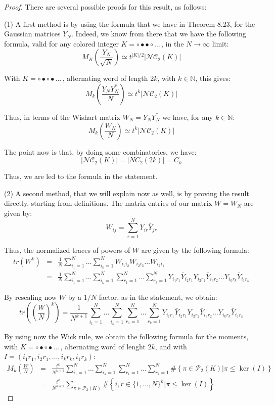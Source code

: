 \documentclass[12pt]{amsbook}
\begin{document}
\begin{proof}
There are several possible proofs for this result, as follows:

\medskip

(1) A first method is by using the formula that we have in Theorem 8.23, for the Gaussian matrices $Y_N$. Indeed, we know from there that we have the following formula, valid for any colored integer $K=\circ\bullet\bullet\circ\ldots\,$, in the $N\to\infty$ limit:
$$M_K\left(\frac{Y_N}{\sqrt{N}}\right)\simeq t^{|K|/2}|\mathcal{NC}_2(K)|$$

With $K=\circ\bullet\circ\bullet\ldots\,$, alternating word of length $2k$, with $k\in\mathbb N$, this gives:
$$M_k\left(\frac{Y_NY_N^*}{N}\right)\simeq t^k|\mathcal{NC}_2(K)|$$

Thus, in terms of the Wishart matrix $W_N=Y_NY_N^*$ we have, for any $k\in\mathbb N$:
$$M_k\left(\frac{W_N}{N}\right)\simeq t^k|\mathcal{NC}_2(K)|$$

The point now is that, by doing some combinatorics, we have:
$$|\mathcal{NC}_2(K)|=|NC_2(2k)|=C_k$$

Thus, we are led to the formula in the statement.

\medskip

(2) A second method, that we will explain now as well, is by proving the result directly, starting from definitions. The matrix entries of our matrix $W=W_N$ are given by:
$$W_{ij}=\sum_{r=1}^NY_{ir}\bar{Y}_{jr}$$

Thus, the normalized traces of powers of $W$ are given by the following formula:
\begin{eqnarray*}
tr(W^k)
&=&\frac{1}{N}\sum_{i_1=1}^N\ldots\sum_{i_k=1}^NW_{i_1i_2}W_{i_2i_3}\ldots W_{i_ki_1}\\
&=&\frac{1}{N}\sum_{i_1=1}^N\ldots\sum_{i_k=1}^N\sum_{r_1=1}^N\ldots\sum_{r_k=1}^NY_{i_1r_1}\bar{Y}_{i_2r_1}Y_{i_2r_2}\bar{Y}_{i_3r_2}\ldots Y_{i_kr_k}\bar{Y}_{i_1r_k}
\end{eqnarray*}

By rescaling now $W$ by a $1/N$ factor, as in the statement, we obtain:
$$tr\left(\left(\frac{W}{N}\right)^k\right)=\frac{1}{N^{k+1}}\sum_{i_1=1}^N\ldots\sum_{i_k=1}^N\sum_{r_1=1}^N\ldots\sum_{r_k=1}^NY_{i_1r_1}\bar{Y}_{i_2r_1}Y_{i_2r_2}\bar{Y}_{i_3r_2}\ldots Y_{i_kr_k}\bar{Y}_{i_1r_k}$$

By using now the Wick rule, we obtain the following formula for the moments, with $K=\circ\bullet\circ\bullet\ldots\,$, alternating word of lenght $2k$, and with $I=(i_1r_1,i_2r_1,\ldots,i_kr_k,i_1r_k)$:
\begin{eqnarray*}
M_k\left(\frac{W}{N}\right)
&=&\frac{t^k}{N^{k+1}}\sum_{i_1=1}^N\ldots\sum_{i_k=1}^N\sum_{r_1=1}^N\ldots\sum_{r_k=1}^N\#\left\{\pi\in\mathcal P_2(K)\Big|\pi\leq\ker(I)\right\}\\
&=&\frac{t^k}{N^{k+1}}\sum_{\pi\in\mathcal P_2(K)}\#\left\{i,r\in\{1,\ldots,N\}^k\Big|\pi\leq\ker(I)\right\}
\end{eqnarray*}


\end{proof}
\end{document}
